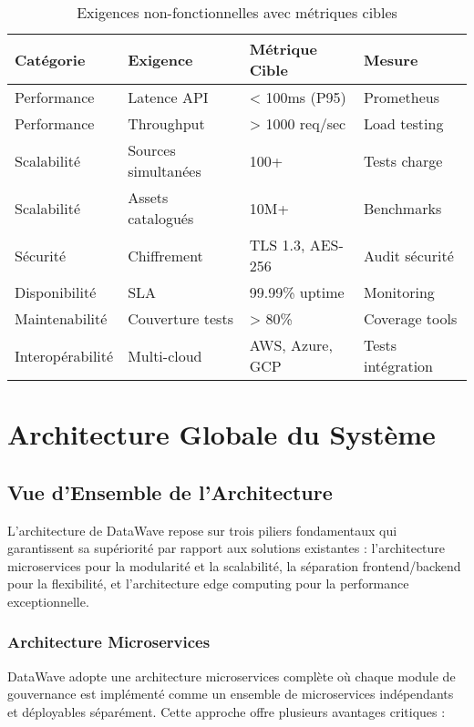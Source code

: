 \begin{table}[htpb]
\centering
\caption{Exigences non-fonctionnelles avec métriques cibles}
\label{tab:exigences_non_fonctionnelles}
\begin{tabular}{|p{}|p{}|p{}|p{}|}
\hline
\textbf{Catégorie} & \textbf{Exigence} & \textbf{Métrique Cible} & \textbf{Mesure} \\
\hline
Performance & Latence API & < 100ms (P95) & Prometheus \\
\hline
Performance & Throughput & > 1000 req/sec & Load testing \\
\hline
Scalabilité & Sources simultanées & 100+ & Tests charge \\
\hline
Scalabilité & Assets catalogués & 10M+ & Benchmarks \\
\hline
Sécurité & Chiffrement & TLS 1.3, AES-256 & Audit sécurité \\
\hline
Disponibilité & SLA & 99.99\% uptime & Monitoring \\
\hline
Maintenabilité & Couverture tests & > 80\% & Coverage tools \\
\hline
Interopérabilité & Multi-cloud & AWS, Azure, GCP & Tests intégration \\
\hline
\end{tabular}
\end{table}

\section{Architecture Globale du Système}

\subsection{Vue d'Ensemble de l'Architecture}

L'architecture de DataWave repose sur trois piliers fondamentaux qui garantissent sa supériorité par rapport aux solutions existantes : l'architecture microservices pour la modularité et la scalabilité, la séparation frontend/backend pour la flexibilité, et l'architecture edge computing pour la performance exceptionnelle.

\subsubsection{Architecture Microservices}

DataWave adopte une architecture microservices complète où chaque module de gouvernance est implémenté comme un ensemble de microservices indépendants et déployables séparément. Cette approche offre plusieurs avantages critiques :

